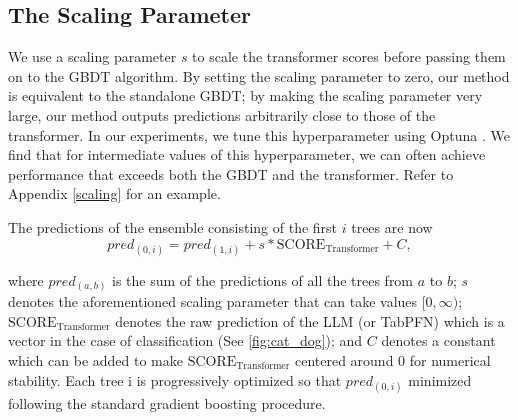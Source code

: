 \subsection{The Scaling Parameter}
We use a scaling parameter $s$ to scale the transformer scores before passing them on to the GBDT algorithm. By setting the scaling parameter to zero, our method is equivalent to the standalone GBDT; by making the scaling parameter very large, our method outputs predictions arbitrarily close to those of the transformer. In our experiments, we tune this hyperparameter using Optuna \citep{optuna_2019}. We find that for intermediate values of this hyperparameter, we can often achieve performance that exceeds both the GBDT and the transformer. Refer to Appendix \ref{scaling} for an example.

The predictions of the ensemble consisting of the first $i$ trees are now 
\[ pred_{(0,i)} = pred_{(1,i)} + s*\text{SCORE}_{\text{Transformer}} + C,\]

where $pred_{(a,b)}$ is the sum of the predictions of all the  trees from $a$ to $b$; $s$ denotes the aforementioned scaling parameter that can take values $[0, \infty)$; $\text{SCORE}_{\text{Transformer}}$ denotes the raw prediction of the LLM (or TabPFN) which is a vector in the case of classification (See \ref{fig:cat_dog}); and $C$ denotes a constant which can be added to make $\text{SCORE}_{\text{Transformer}}$ centered around 0 for numerical stability. 
Each tree i is progressively optimized so that $pred_{(0,i)}$ minimized following the standard gradient boosting procedure.

